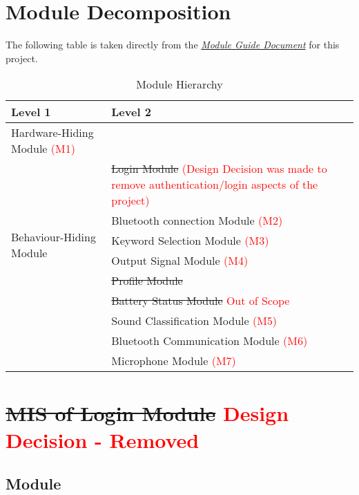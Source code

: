 \documentclass[12pt, titlepage]{article}
\begin{document}
\section{Module Decomposition}

The following table is taken directly from the \href{https://github.com/jordanbierbrier/capstone/blob/main/docs/Design/SoftArchitecture/MG.pdf}{\textit{Module Guide Document}} for this project.

\begin{table}[h!]
\centering
\begin{tabular}{p{} p{}}
\toprule
\textbf{Level 1} & \textbf{Level 2}\\
\midrule

{Hardware-Hiding Module \textcolor{red}{(M1)}} & ~ \\
\midrule

\multirow{7}{0.3\textwidth}{Behaviour-Hiding Module} & \sout{Login Module} \textcolor{red}{(Design Decision was made to remove authentication/login aspects of the project)}\\
& Bluetooth connection Module \textcolor{red}{(M2)}\\
& Keyword Selection Module \textcolor{red}{(M3)}\\
& Output Signal Module \textcolor{red}{(M4)}\\
& \sout{Profile Module}\\ 
& \sout{Battery Status Module} \textcolor{red}{Out of Scope}\\
\midrule

\multirow{3}{0.3\textwidth}{Software Decision Module} & {Sound Classification Module} \textcolor{red}{(M5)}\\
& Bluetooth Communication Module \textcolor{red}{(M6)}\\
& Microphone Module \textcolor{red}{(M7)}\\
\bottomrule

\end{tabular}
\label{TblMH}
\caption{Module Hierarchy}
\end{table}

\newpage


\section{\sout{MIS of Login Module} \textcolor{red}{Design Decision - Removed}} \label{Login Module}

\subsection{Module}
\end{document}
